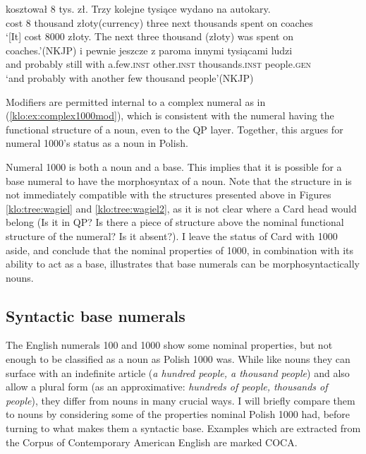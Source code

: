 \documentclass[output=paper]{langscibook}
\begin{document}
\ea \label{klo:ex:mod1000}
\ea \gll {\dots} kosztował 8 tys. zł. Trzy kolejne tysiące wydano na autokary.\\
{} cost 8 thousand złoty(currency) three next thousands spent on coaches\\
\glt `[It] cost 8000 złoty. The next three thousand (złoty) was spent on coaches.'\hfill (NKJP) \label{klo:ex:complex1000mod}
\ex \gll {\dots} i pewnie jeszcze z paroma innymi tysiącami ludzi\\
{} and probably still with a.few.\textsc{inst} other.\textsc{inst} thousands.\textsc{inst} people.\textsc{gen}\\
\glt `and probably with another few thousand people'\hfill (NKJP)
\z \z %

\noindent Modifiers are permitted internal to a complex numeral as in (\ref{klo:ex:complex1000mod}), which is consistent with the numeral having the functional structure of a noun, even to the QP layer. Together, this argues for numeral 1000's status as a noun in Polish.

Numeral 1000 is both a noun and a base. This implies that it is possible for a base numeral to have the morphosyntax of a noun. Note that the structure in  is not immediately compatible with the structures presented above in Figures \ref{klo:tree:wagiel} and \ref{klo:tree:wagiel2}, as it is not clear where a Card head would belong (Is it in QP? Is there a piece of structure above the nominal functional structure of the numeral? Is it absent?). I leave the status of Card with 1000 aside, and conclude that the nominal properties of 1000, in combination with its ability to act as a base, illustrates that base numerals can be morphosyntactically nouns.

\subsection {Syntactic base numerals}\largerpage
\begin{sloppypar}
The English numerals 100 and 1000 show some nominal properties, but not enough to be classified as a noun as Polish 1000 was. While like nouns they can surface with an indefinite article (\textit{a hundred people, a thousand people}) and also allow a plural form (as an approximative: \textit{hundreds of people, thousands of people}), they differ from nouns in many crucial ways. I will briefly compare them to nouns by considering some of the properties nominal Polish 1000 had, before turning to what makes them a syntactic base. Examples which are extracted from the Corpus of Contemporary American English are marked COCA.
\end{sloppypar}
\end{document}

